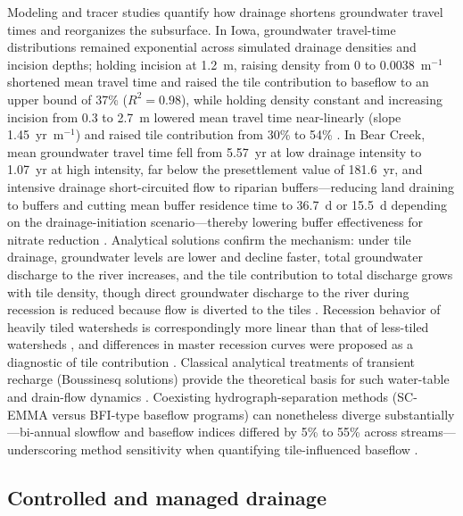 \documentclass[11pt]{article}
\begin{document}
Modeling and tracer studies quantify how drainage shortens groundwater travel times and reorganizes the subsurface. In Iowa, groundwater travel-time distributions remained exponential across simulated drainage densities and incision depths; holding incision at 1.2~m, raising density from 0 to 0.0038~m$^{-1}$ shortened mean travel time and raised the tile contribution to baseflow to an upper bound of 37\% ($R^2=0.98$), while holding density constant and increasing incision from 0.3 to 2.7~m lowered mean travel time near-linearly (slope 1.45~yr~m$^{-1}$) and raised tile contribution from 30\% to 54\% \parencite{Schilling2012}. In Bear Creek, mean groundwater travel time fell from 5.57~yr at low drainage intensity to 1.07~yr at high intensity, far below the presettlement value of 181.6~yr, and intensive drainage short-circuited flow to riparian buffers---reducing land draining to buffers and cutting mean buffer residence time to 36.7~d or 15.5~d depending on the drainage-initiation scenario---thereby lowering buffer effectiveness for nitrate reduction \parencite{Schilling2015}. Analytical solutions confirm the mechanism: under tile drainage, groundwater levels are lower and decline faster, total groundwater discharge to the river increases, and the tile contribution to total discharge grows with tile density, though direct groundwater discharge to the river during recession is reduced because flow is diverted to the tiles \parencite{Liang2015}. Recession behavior of heavily tiled watersheds is correspondingly more linear than that of less-tiled watersheds \parencite{Schilling2008}, and differences in master recession curves were proposed as a diagnostic of tile contribution \parencite{Schilling2008}. Classical analytical treatments of transient recharge (Boussinesq solutions) provide the theoretical basis for such water-table and drain-flow dynamics \parencite{SINGH1980,Bouarfa2000}. Coexisting hydrograph-separation methods (SC-EMMA versus BFI-type baseflow programs) can nonetheless diverge substantially---bi-annual slowflow and baseflow indices differed by 5\% to 55\% across streams---underscoring method sensitivity when quantifying tile-influenced baseflow \parencite{Kronholm2015}.

\subsection{Controlled and managed drainage}
\end{document}
